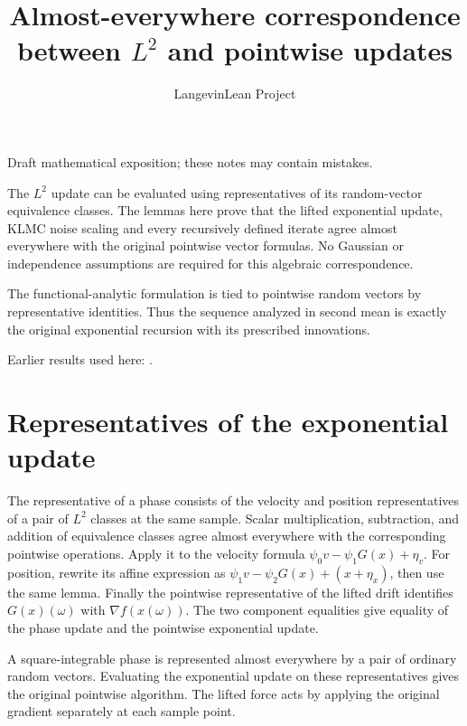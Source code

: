 \documentclass[11pt,a4paper]{article}
\title{\texorpdfstring{Almost-everywhere correspondence between \(L^{2}\) and pointwise updates}{Almost-everywhere correspondence between L² and pointwise updates}}
\author{LangevinLean Project}
\date{}
\begin{document}
\maketitle
Draft mathematical exposition; these notes may contain mistakes.


The \(L^{2}\) update can be evaluated using representatives of its random-vector equivalence classes. The lemmas here prove that the lifted exponential update, KLMC noise scaling and every recursively defined iterate agree almost everywhere with the original pointwise vector formulas. No Gaussian or independence assumptions are required for this algebraic correspondence.



The functional-analytic formulation is tied to pointwise random vectors by representative identities. Thus the sequence analyzed in second mean is exactly the original exponential recursion with its prescribed innovations.



Earlier results used here: \cite[Section~3.13]{LangevinLean2026ULASC}.

\section{\texorpdfstring{Representatives of the exponential update}{Representatives of the exponential update}}


The representative of a phase consists of the velocity and position representatives of a pair of \(L^{2}\) classes at the same sample. Scalar multiplication, subtraction, and addition of equivalence classes agree almost everywhere with the corresponding pointwise operations. Apply it to the velocity formula \(\psi_0v-\psi_1G(x)+\eta_v\). For position, rewrite its affine expression as \(\psi_1v-\psi_2G(x)+(x+\eta_x)\), then use the same lemma. Finally the pointwise representative of the lifted drift identifies \(G(x)(\omega)\) with \(\nabla f(x(\omega))\). The two component equalities give equality of the phase update and the pointwise exponential update.



A square-integrable phase is represented almost everywhere by a pair of ordinary random vectors. Evaluating the exponential update on these representatives gives the original pointwise algorithm. The lifted force acts by applying the original gradient separately at each sample point.
\end{document}
